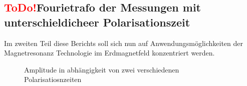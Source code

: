 \subsection{\textcolor{red}{ToDo!}Fourietrafo der Messungen mit unterschieldicheer Polarisationszeit}
Im zweiten Teil diese Berichts soll sich nun auf Anwendungsmöglichkeiten der Magnetresonanz Technologie im Erdmagnetfeld konzentriert werden. 

\begin{figure}[H]
    \centering
    
    \caption{Amplitude in abhängigkeit von zwei verschiedenen Polarisatiosnzeiten}
\end{figure}